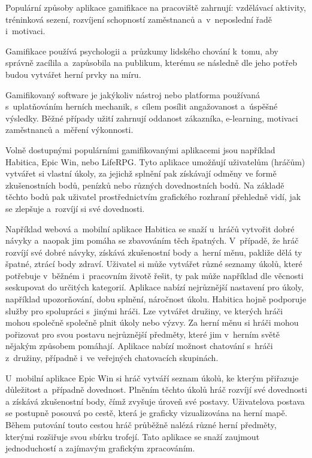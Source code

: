 \documentclass[twoside, 12pt]{article}
\begin{document}
\par

Populární způsoby aplikace gamifikace na pracoviště zahrnují: vzdělávací aktivity,
tréninková sezení, rozvíjení schopností zaměstnanců a~v~neposlední řadě i~motivaci.

Gamifikace používá psychologii a~průzkumy lidského chování k~tomu,
aby správně zacílila a~zapůsobila na publikum,
kterému se následně dle jeho potřeb budou vytvářet herní prvky na míru.


Gamifikovaný software je jakýkoliv nástroj nebo platforma používaná s~uplatňováním herních mechanik,
s~cílem posílit angažovanost a~úspěšné výsledky.
Běžné případy užití zahrnují oddanost zákazníka, e-learning, motivaci zaměstnanců a~měření výkonnosti.

\par

Volně dostupnými populárními gamifikovanými aplikacemi
jsou například Habitica, Epic Win, nebo LifeRPG.
Tyto aplikace umožňují uživatelům (hráčům) vytvářet si vlastní úkoly,
za jejichž splnění pak získávají odměny ve formě zkušenostních bodů,
penízků nebo různých dovednostních bodů.
Na základě těchto bodů pak uživatel prostřednictvím grafického rozhraní přehledně vidí,
jak se zlepšuje a~rozvíjí si své dovednosti.

\par

Například webová a~mobilní aplikace Habitica se snaží u~hráčů vytvořit dobré návyky
a~naopak jim pomáha se zbavováním těch špatných.
V~případě, že hráč rozvíjí své dobré návyky,
získává zkušenostní body a~herní měnu,
pakliže dělá ty špatné, ztrácí body zdraví.
Uživatel si může vytvářet různé seznamy úkolů,
které potřebuje v~běžném i~pracovním životě řešit,
ty pak může například dle věcnosti seskupovat do určitých kategorií.
Aplikace nabízí nejrůznější nastavení pro úkoly, například upozorňování, dobu splnění, náročnost úkolu.
Habitica hojně podporuje služby pro spolupráci s~jinými hráči. Lze vytvářet družiny,
ve kterých hráči mohou společně společně plnit úkoly nebo výzvy.
Za herní měnu si hráči mohou pořizovat pro svou postavu nejrůznější předměty,
které jim v~herním světě nějakým způsobem pomáhají.
Aplikace nabízí možnost chatování s~hráči z~družiny, případně i~ve veřejných chatovacích skupinách.

\par

U~mobilní aplikace Epic Win si hráč vytváří seznam úkolů,
ke kterým přiřazuje důležitost a~případně dovednost.
Plněním těchto úkolů hráč rozvíjí své dovednosti
a získává zkušenostní body,
čímž zvyšuje úroveň své postavy.
Uživatelova postava se postupně posouvá po cestě,
která je graficky vizualizována na herní mapě.
Během putování touto cestou hráč průběžně nalézá
různé herní předměty, kterými rozšiřuje svou sbírku trofejí.
Tato aplikace se snaží zaujmout jednoduchostí a zajímavým grafickým zpracováním.
\end{document}
